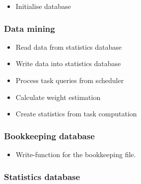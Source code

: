 {		\begin{itemize}
			\item Initialise database
		\end{itemize}
		
		\subsubsection{Data mining}
	
			\begin{itemize}
				\item Read data from statistics database
				\item Write data into statistics database
				\item Process task queries from scheduler
				\item Calculate weight estimation 
				\item Create statistics from task computation
			\end{itemize}
	
	
		
		
		\subsubsection{Bookkeeping database}
	
			\begin{itemize}
				\item Write-function for the bookkeeping file.
			\end{itemize}
	
		\subsubsection{Statistics database}
	
			\begin{itemize}
				

\end{itemize}}
